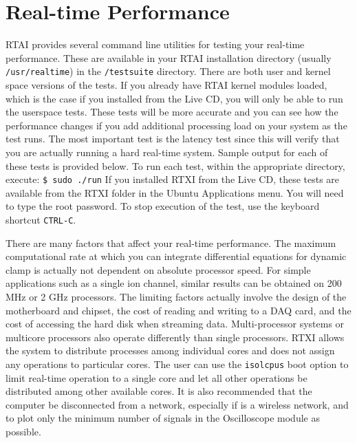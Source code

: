 \chapter{Real-time Performance}
\label{RTAI benchmarks}
RTAI provides several command line utilities for testing your real-time performance. These are available in your RTAI installation directory (usually \texttt{/usr/realtime}) in the \texttt{/testsuite} directory. There are both user and kernel space versions of the tests. If you already have RTAI kernel modules loaded, which is the case if you installed from the Live CD, you will only be able to run the userspace tests. These tests will be more accurate and you can see how the performance changes if you add additional processing load on your system as the test runs. The most important test is the latency test since this will verify that you are actually running a hard real-time system. Sample output for each of these tests is provided below. To run each test, within the appropriate directory, execute: \texttt{\$ sudo ./run} If you installed RTXI from the Live CD, these tests are available from the RTXI folder in the Ubuntu Applications menu. You will need to type the root password. To stop execution of the test, use the keyboard shortcut \texttt{CTRL-C}.

There are many factors that affect your real-time performance. The maximum computational rate at which you can integrate differential equations for dynamic clamp is actually not dependent on absolute processor speed. For simple applications such as a single ion channel, similar results can be obtained on 200 MHz or 2 GHz processors. The limiting factors actually involve the design of the motherboard and chipset, the cost of reading and writing to a DAQ card, and the cost of accessing the hard disk when streaming data. Multi-processor systems or multicore processors also operate differently than single processors. RTXI allows the system to distribute processes among individual cores and does not assign any operations to particular cores. The user can use the \attention \texttt{isolcpus} boot option to limit real-time operation to a single core and let all other operations be distributed among other available cores. It is also recommended that the computer be disconnected from a network, especially if is a wireless network, and to plot only the minimum number of signals in the Oscilloscope module as possible.

